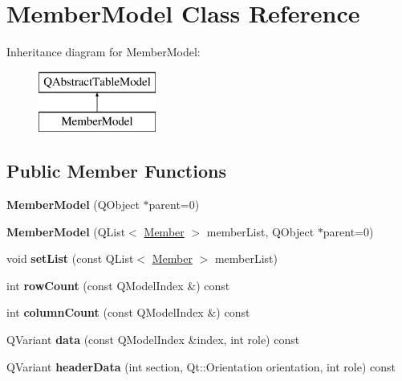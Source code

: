 \hypertarget{class_member_model}{}\section{Member\+Model Class Reference}
\label{class_member_model}
Inheritance diagram for Member\+Model\+:\begin{figure}[H]
\begin{center}
\leavevmode
\includegraphics[height=2.000000cm]{class_member_model}
\end{center}
\end{figure}
\subsection*{Public Member Functions}
\begin{DoxyCompactItemize}
\item 
\mbox{\label{class_member_model_a1374db96c157cea288a8daa66ac4fcbf}} 
{\bfseries Member\+Model} (Q\+Object $\ast$parent=0)
\item 
\mbox{\label{class_member_model_a3d6668245c339005f8c1ab1e82e3f8d7}} 
{\bfseries Member\+Model} (Q\+List$<$ \mbox{\hyperlink{class_member}{Member}} $>$ member\+List, Q\+Object $\ast$parent=0)
\item 
\mbox{\label{class_member_model_aa98e364e96a8a2a45bd94480dc68ca20}} 
void {\bfseries set\+List} (const Q\+List$<$ \mbox{\hyperlink{class_member}{Member}} $>$ member\+List)
\item 
\mbox{\label{class_member_model_a066e78fba36c60d712d90df5cfb244a5}} 
int {\bfseries row\+Count} (const Q\+Model\+Index \&) const
\item 
\mbox{\label{class_member_model_a748ee191f0f13de9a4176c8094ec7017}} 
int {\bfseries column\+Count} (const Q\+Model\+Index \&) const
\item 
\mbox{\label{class_member_model_ad7546e6283f6c1c00f4780bc723f8b96}} 
Q\+Variant {\bfseries data} (const Q\+Model\+Index \&index, int role) const
\item 
\mbox{\label{class_member_model_aea1d06c087df5f3afcf9bd579b1f4586}} 
Q\+Variant {\bfseries header\+Data} (int section, Qt\+::\+Orientation orientation, int role) const
\end{DoxyCompactItemize}
